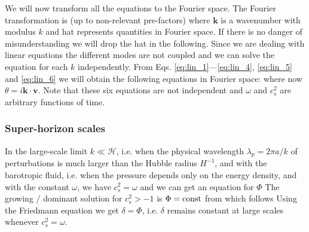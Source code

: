 We will now transform all the equations to the Fourier space. The Fourier transformation is (up to non-relevant pre-factors)
where $\bm k$ is a wavenumber with modulus $k$ and hat represents quantities in Fourier space. If there is no danger of misunderstanding we will drop the hat in the following. Since we are dealing with linear equations the different modes are not coupled and we can solve the equation for each $k$ independently.
 From Eqs. \eqref{eq:lin_1}---\eqref{eq:lin_4}, \eqref{eq:lin_5} and \eqref{eq:lin_6} we will obtain the following equations in Fourier space:
where now $\theta=i\bm{k\cdot  v}$. Note that these six equations are not independent and $\omega$ and $c_s^2$ are arbitrary functions of time.
\subsubsection{Super-horizon scales}
In the large-scale limit $k\ll\mathcal{H}$, i.e. when the physical wavelength $\lambda_p=2\pi a/k$ of perturbations is much larger than the Hubble radius $H^{-1}$, and with the barotropic fluid, i.e. when the pressure depends only on the energy density, and with the constant $\omega$, we have $c_s^2=\omega$ and we can get an equation for $\Phi$
The growing / dominant solution for $c_s^2>-1$ is $\Phi=\rm{const}$ from which follows
Using the Friedmann equation we get $\delta=\Phi$, i.e. $\delta$ remains constant at large scales whenever $c_s^2=\omega$.
